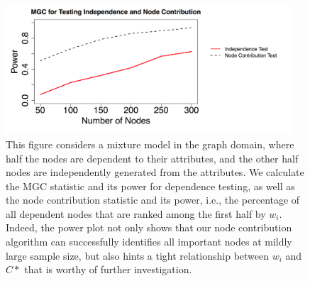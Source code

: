 \documentclass[simplex.tex]{subfiles}
\begin{document}
\begin{figure}[h!]
\begin{cframed}
\centering
\includegraphics[width=0.95\textwidth]{./figs/mgcPow.png}
\caption{
This figure considers a mixture model in the graph domain,
where half the nodes are dependent to their attributes, and the other
half nodes are independently generated from the attributes. We calculate
the MGC statistic and its power for dependence testing, as well as the
node contribution statistic and its power, i.e., the percentage of all
dependent nodes that are ranked among the first half by $w_i$.  Indeed,
the power plot not only shows that our node contribution algorithm can
successfully identifies all important nodes at mildly large sample size,
but also hints a tight relationship between $w_i$ and $C*$ that is
worthy of further investigation. 
}
\label{fig:mgcP}
\end{cframed}
\end{figure}
\end{document}
